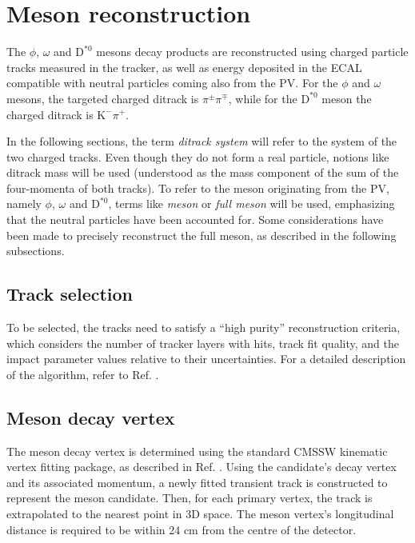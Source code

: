 \section{Meson reconstruction}\label{sec:meson_reconstruction}

The $\phi$, $\omega$ and $\text{D}^{*0}$ mesons decay products are reconstructed using charged particle tracks measured in the tracker, as well as energy deposited in the ECAL compatible with neutral particles coming also from the PV. For the $\phi$ and $\omega$ mesons, the targeted charged ditrack is $\pi^\pm\pi^\mp$, while for the $\text{D}^{*0}$ meson the charged ditrack is $\text{K}^{-}\pi^{+}$.

In the following sections, the term \textit{ditrack system} will refer to the system of the two charged tracks. Even though they do not form a real particle, notions like ditrack mass will be used (understood as the mass component of the sum of the four-momenta of both tracks). To refer to the meson originating from the PV, namely $\phi$, $\omega$ and $\text{D}^{*0}$, terms like \textit{meson} or \textit{full meson} will be used, emphasizing that the neutral particles have been accounted for. Some considerations have been made to precisely reconstruct the full meson, as described in the following subsections.

\subsection{Track selection}
To be selected, the tracks need to satisfy a ``high purity'' reconstruction criteria, which considers the number of tracker layers with hits, track fit quality, and the impact parameter values relative to their uncertainties. For a detailed description of the algorithm, refer to Ref. \cite{CMS:2014pgm}.

\subsection{Meson decay vertex}
The meson decay vertex is determined using the standard CMSSW \cite{CMSSW} kinematic vertex fitting package, as described in Ref. \cite{Prokofiev:2005zz}. Using the candidate's decay vertex and its associated momentum, a newly fitted transient track is constructed to represent the meson candidate. Then, for each primary vertex, the track is extrapolated to the nearest point in 3D space. The meson vertex's longitudinal distance is required to be within 24 cm from the centre of the detector.

